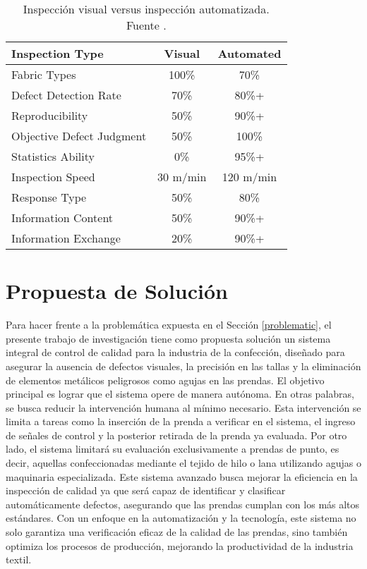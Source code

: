 \begin{table}[H]
	\centering
	\caption[Inspección visual versus inspección automatizada.]{Inspección visual versus inspección automatizada. Fuente \cite{Islam2006ASuitable}.}
	\begin{tabular}{|p{13em}|c|c|}
		\hline
		\textbf{Inspection Type} & {\textbf{Visual}} & \textbf{Automated} \bigstrut\\
		\hline
		Fabric Types & 100\% & \multicolumn{1}{c|}{70\%} \bigstrut\\
		\hline
		Defect Detection Rate & 70\%  & 80\%+ \bigstrut\\
		\hline
		Reproducibility & 50\%  & 90\%+ \bigstrut\\
		\hline
		Objective Defect Judgment & 50\%  & {100\%} \bigstrut\\
		\hline
		Statistics Ability & 0\%   & 95\%+ \bigstrut\\
		\hline
		Inspection Speed & {30 m/min} & {120 m/min} \bigstrut\\
		\hline
		Response Type & 50\%  & {80\%} \bigstrut\\
		\hline
		Information Content & 50\%  & 90\%+ \bigstrut\\
		\hline
		Information Exchange & 20\%  & 90\%+ \bigstrut\\
		\hline
	\end{tabular}%
	\label{tab:visual_vs_automated}%
\end{table}%

\section{Propuesta de Solución}

Para hacer frente a la problemática expuesta en el Sección \ref{problematic}, el presente trabajo de investigación tiene como propuesta solución un sistema integral de control de calidad para la industria de la confección, diseñado para asegurar la ausencia de defectos visuales, la precisión en las tallas y la eliminación de elementos metálicos peligrosos como agujas en las prendas. El objetivo principal es lograr que el sistema opere de manera autónoma. En otras palabras, se busca reducir la intervención humana al mínimo necesario. Esta intervención se limita a tareas como la inserción de la prenda a verificar en el sistema, el ingreso de señales de control y la posterior retirada de la prenda ya evaluada. Por otro lado, el sistema limitará su evaluación exclusivamente a prendas de punto, es decir, aquellas confeccionadas mediante el tejido de hilo o lana utilizando agujas o maquinaria especializada. Este sistema avanzado busca mejorar la eficiencia en la inspección de calidad ya que será capaz de identificar y clasificar automáticamente defectos, asegurando que las prendas cumplan con los más altos estándares. Con un enfoque en la automatización y la tecnología, este sistema no solo garantiza una verificación eficaz de la calidad de las prendas, sino también optimiza los procesos de producción, mejorando la productividad de la industria textil.

